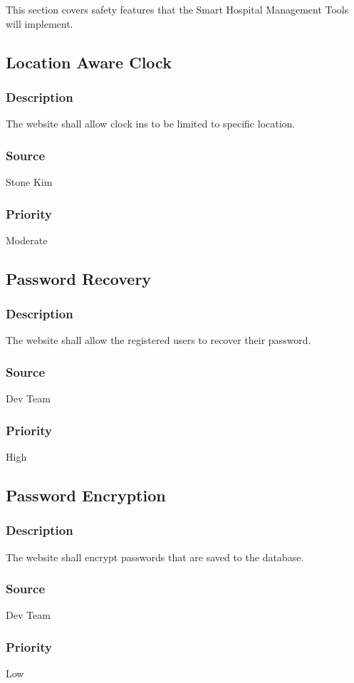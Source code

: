 This section covers safety features that the Smart Hospital Management Tools will implement.

\subsection{Location Aware Clock}
\subsubsection{Description}
The website shall allow clock ins to be limited to specific location.
\subsubsection{Source}
Stone Kim
\subsubsection{Priority}
Moderate

\subsection{Password Recovery}
\subsubsection{Description}
The website shall allow the registered users to recover their password.
\subsubsection{Source}
Dev Team
\subsubsection{Priority}
High

\subsection{Password Encryption}
\subsubsection{Description}
The website shall encrypt passwords that are saved to the database.
\subsubsection{Source}
Dev Team
\subsubsection{Priority}
Low
